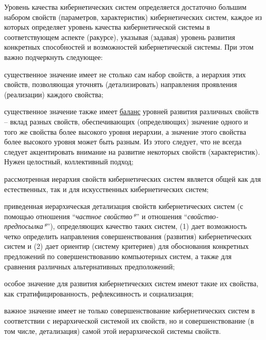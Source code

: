 \begin{SCn}
\begin{scnsubstruct}
{Уровень качества кибернетических систем определяется достаточно большим набором свойств (параметров, характеристик) кибернетических систем, каждое из которых определяет уровень качества кибернетической системы в соответствующем аспекте (ракурсе), указывая (задавая) уровень развития конкретных  способностей и возможностей кибернетической системы. При этом важно подчеркнуть следующее:
\begin{scnitemize}
	\item существенное значение имеет не столько сам набор свойств, а иерархия этих свойств, позволяющая уточнять (детализировать) направления проявления (реализации) каждого свойства;
	\item существенное значение также имеет \uline{баланс} уровней развития различных свойств -- вклад разных свойств, обеспечивающих (определяющих) значение одного и того же свойства более высокого уровня иерархии, а значение этого свойства более высокого уровня может быть разным. Из этого следует, что не всегда следует акцентировать внимание на развитие некоторых свойств (характеристик). Нужен целостный, коллективный подход;
	\item рассмотренная иерархия свойств кибернетических систем является общей как для естественных, так и для искусственных кибернетических систем;
	\item приведенная иерархическая детализация свойств кибернетических систем (с помощью отношения ``\textit{частное свойство*}'' и отношения ``\textit{свойство-предпосылка*}''), определяющих качество таких систем, (1) дает возможность четко определить направления совершенствования (развития) кибернетических систем и (2) дает ориентир (систему критериев) для обоснования конкретных предложений по совершенствованию компьютерных систем, а также для сравнения различных альтернативных предположений;
	\item особое значение для развития кибернетических систем имеют такие их свойства, как стратифицированность, рефлексивность и социализация;
	\item важное значение имеет не только совершенствование кибернетических систем в соответствии с иерархической системой их свойств, но и совершенствование (в том числе, детализация) самой этой иерархической системы свойств. 
\end{scnitemize}}



\end{scnsubstruct}
\end{SCn}
